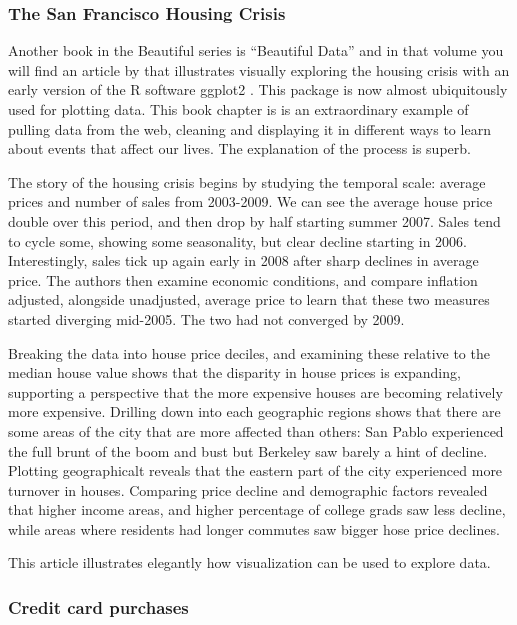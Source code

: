\documentclass{article}
\begin{document}
\subsubsection{The San Francisco Housing Crisis}

Another book in the Beautiful series is ``Beautiful Data'' and in that volume you will find an article by \citet{SFHousing} that illustrates visually exploring the housing crisis with an early version of the R software ggplot2 \citep{wickham2009ggplot2}. This package is now almost ubiquitously used for plotting data. This book chapter is is an extraordinary example of pulling data from the web, cleaning and displaying it in different ways to learn about events that affect our lives. The explanation of the process is superb.

The story of the housing crisis begins by studying the temporal scale: average prices and number of sales from 2003-2009. We can see the average house price double over this period, and then drop by half starting summer 2007. Sales tend to cycle some, showing some seasonality, but clear decline starting in 2006. Interestingly, sales tick up again early in 2008 after sharp declines in average price. The authors then examine economic conditions, and compare inflation adjusted,  alongside unadjusted, average price to learn that these two measures started diverging mid-2005. The two had not converged by 2009.

Breaking the data into house price deciles, and examining these relative to the median house value shows that the disparity in house prices is expanding, supporting a perspective that the more expensive houses are becoming relatively more expensive. Drilling down into each geographic regions shows that there are some areas of the city that are more affected than others: San Pablo experienced the full brunt of the boom and bust but Berkeley saw barely a hint of decline. Plotting {\color[rgb]{0,0,1} geographicalt }  reveals that the eastern part of the city experienced more turnover in houses. Comparing price decline and demographic factors revealed that higher income areas, and higher percentage of college grads saw less decline, while areas where residents had longer commutes saw bigger hose price declines.

This article illustrates elegantly how visualization can be used to explore data.

\subsubsection{Credit card purchases}
\end{document}
